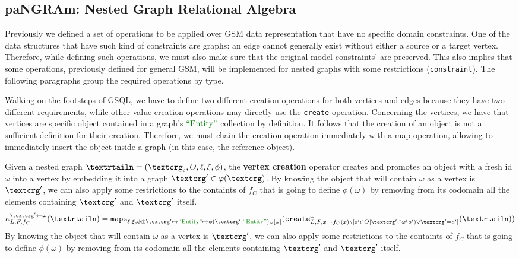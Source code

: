 \subsection{paNGRAm: Nested Graph Relational Algebra}\label{ssec:ngrahop}
Previously we defined a set of operations to be applied over GSM data representation that have no specific domain constraints. One of the data structures that have such kind of constraints are graphs: an edge cannot generally exist without either a source or a target vertex. Therefore, while defining such operations, we must also make sure that the original model constraints' are preserved. This also implies that some operations, previously defined for general GSM, will be implemented for nested graphs with some restrictions (\texttt{constraint}). The following paragraphs group the required operations by type.

Walking on the footsteps of GSQL, we have to define two different   creation operations for both vertices and edges because they have two different requirements, while other value creation operations may directly use the \texttt{create} operation. Concerning the vertices, we have that vertices are specific object contained in a graph's $\ONTA$ collection by definition. It follows that the creation of an object is not a sufficient definition for their creation. Therefore, we must chain the creation operation immediately with a map operation, allowing to immediately insert the object inside a graph (in this case, the reference object).

\begin{definition}
	Given a nested graph $\nested=(\ngraph_c,O,\ell,\xi,\phi)$, the \textbf{vertex creation} operator creates and promotes an object with a fresh id $\omega$ into a vertex by embedding it into a graph $\ngraph'\in\varphi(\ngraph)$. By knowing the object that will contain $\omega$ as a vertex is $\ngraph'$, we can also apply some restrictions to the containts of $f_C$ that is going to define $\phi(\omega)$ by removing from its codomain all the elements containing $\ngraph'$ and $\ngraph'$ itself.
	\[\kappa^{\ngraph'\leftarrow \omega}_{L,F,f_C}(\nested)=\texttt{maps}_{\ell,\xi,\phi\oplus \ngraph'\mapsto\ONTA\mapsto \phi(\ngraph',\ONTA)\cup[\omega]}(\texttt{create}^\omega_{L,F,x\mapsto f_C(x)\backslash[o'\in O|\ngraph'\in \varphi^(o')\vee \ngraph'=o']}(\nested))\]
By knowing the object that will contain $\omega$ as a vertex is $\ngraph'$, we can also apply some restrictions to the containts of $f_C$ that is going to define $\phi(\omega)$ by removing from its codomain all the elements containing $\ngraph'$ and $\ngraph'$ itself.
\end{definition}

